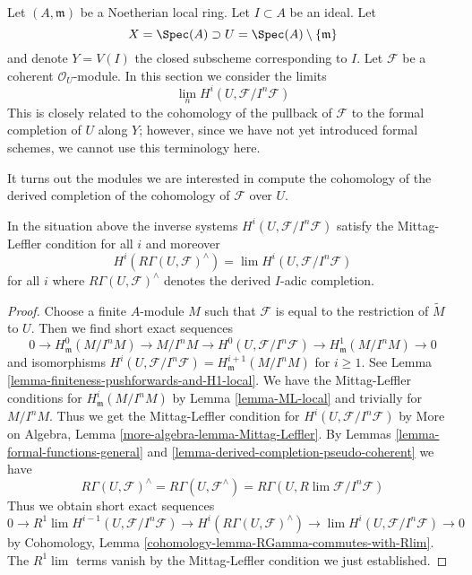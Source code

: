\noindent
Let $(A, \mathfrak m)$ be a Noetherian local ring.
Let $I \subset A$ be an ideal. Let
$$
X = \Spec(A) \supset U = \Spec(A) \setminus \{\mathfrak m\}
$$
and denote $Y = V(I)$ the closed subscheme corresponding to $I$.
Let $\mathcal{F}$ be a coherent $\mathcal{O}_U$-module.
In this section we consider the limits
$$
\lim_n H^i(U, \mathcal{F}/I^n\mathcal{F})
$$
This is closely related to the cohomology of the pullback
of $\mathcal{F}$ to the formal completion of $U$ along $Y$;
however, since we have not yet introduced formal schemes,
we cannot use this terminology here.

\medskip\noindent
It turns out the modules we are interested in compute the cohomology
of the derived completion of the cohomology of $\mathcal{F}$ over $U$.

\begin{lemma}
\label{lemma-compare-with-derived-completion}
In the situation above the inverse systems $H^i(U, \mathcal{F}/I^n\mathcal{F})$
satisfy the Mittag-Leffler condition for all $i$ and moreover
$$
H^i(R\Gamma(U, \mathcal{F})^\wedge) =
\lim H^i(U, \mathcal{F}/I^n\mathcal{F})
$$
for all $i$ where $R\Gamma(U, \mathcal{F})^\wedge$ denotes
the derived $I$-adic completion.
\end{lemma}

\begin{proof}
Choose a finite $A$-module $M$ such that $\mathcal{F}$ is equal to
the restriction of $\widetilde{M}$ to $U$. Then we find short exact sequences
$$
0 \to H^0_\mathfrak m(M/I^nM) \to M/I^nM \to
H^0(U, \mathcal{F}/I^n\mathcal{F}) \to H^1_\mathfrak m(M/I^nM) \to 0
$$
and isomorphisms
$H^i(U, \mathcal{F}/I^n\mathcal{F}) = H^{i + 1}_\mathfrak m(M/I^nM)$
for $i \geq 1$. See Lemma \ref{lemma-finiteness-pushforwards-and-H1-local}.
We have the Mittag-Leffler conditions for
$H^i_\mathfrak m(M/I^nM)$ by Lemma \ref{lemma-ML-local}
and trivially for $M/I^nM$. Thus we get the Mittag-Leffler condition for
$H^i(U, \mathcal{F}/I^n\mathcal{F})$ by
More on Algebra, Lemma \ref{more-algebra-lemma-Mittag-Leffler}.
By Lemmas \ref{lemma-formal-functions-general} and
\ref{lemma-derived-completion-pseudo-coherent} we have
$$
R\Gamma(U, \mathcal{F})^\wedge =
R\Gamma(U, \mathcal{F}^\wedge) =
R\Gamma(U, R\lim \mathcal{F}/I^n\mathcal{F})
$$
Thus we obtain short exact sequences
$$
0 \to R^1\lim H^{i - 1}(U, \mathcal{F}/I^n\mathcal{F}) \to
H^i(R\Gamma(U, \mathcal{F})^\wedge) \to
\lim H^i(U, \mathcal{F}/I^n\mathcal{F}) \to 0
$$
by Cohomology, Lemma \ref{cohomology-lemma-RGamma-commutes-with-Rlim}.
The $R^1\lim$ terms vanish by the Mittag-Leffler condition
we just established.
\end{proof}

